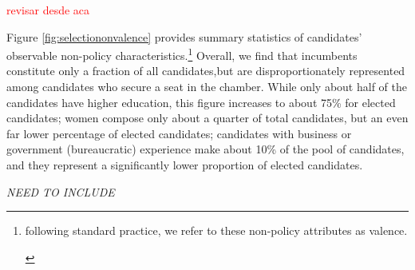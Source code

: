 \documentclass[12pt,english]{article}
\newcommand{\note}[1]{\footnote{ \begin{doublespace}#1  \end{doublespace}}}
\newcommand{\lyxdot}{.}
\numberwithin{equation}{section}
\theoremstyle{plain}
\theoremstyle{remark}
\theoremstyle{plain}
\newcommand{\red}[1]{\textcolor{red}{#1}}
\begin{document}
\bigskip \Large 
\red{revisar desde aca}
\bigskip \normalsize



Figure \ref{fig:selectiononvalence} provides summary statistics of candidates' observable non-policy  characteristics.\note{following standard practice, we refer to these non-policy attributes as valence.} Overall, we find that incumbents constitute only a fraction of all candidates,but are disproportionately represented among candidates who secure a seat in the chamber. While only about half of the candidates have higher education, this figure increases to about 75\% for elected candidates; women compose only about a quarter of total candidates, but an even far lower percentage of elected candidates; candidates with business or government (bureaucratic) experience  make about 10\% of the pool of candidates, and they represent a significantly lower proportion of elected candidates. %

\emph{NEED TO INCLUDE}

\end{document}
